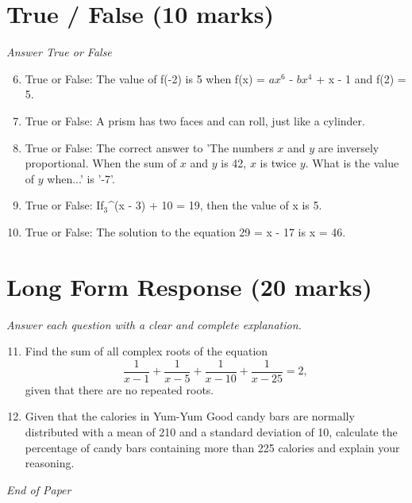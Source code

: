 \documentclass[12pt]{article}
\begin{document}
\section*{True / False (10 marks)}
\textit{Answer True or False}
\begin{enumerate}[label=\arabic*.]
\setcounter{enumi}{5}
\item True or False: The value of f(-2) is 5 when f(x) = $ax^6$ - $bx^4$ + x - 1 and f(2) = 5.
\item True or False: A prism has two faces and can roll, just like a cylinder.
\item True or False: The correct answer to 'The numbers $x$ and $y$ are inversely proportional. When the sum of $x$ and $y$ is 42, $x$ is twice $y$. What is the value of $y$ when...' is '-7'.
\item True or False: If$_{3}$^(x - 3) + 10 = 19, then the value of x is 5.
\item True or False: The solution to the equation 29 = x - 17 is x = 46.
\end{enumerate}

\section*{Long Form Response (20 marks)}
\textit{Answer each question with a clear and complete explanation.}
\begin{enumerate}[label=\arabic*.]
\setcounter{enumi}{10}
\item Find the sum of all complex roots of the equation \[\frac{1}{x-1} + \frac{1}{x-5} + \frac{1}{x-10} + \frac{1}{x-25} = 2,\]given that there are no repeated roots.
\item Given that the calories in Yum-Yum Good candy bars are normally distributed with a mean of 210 and a standard deviation of 10, calculate the percentage of candy bars containing more than 225 calories and explain your reasoning.
\end{enumerate}

\vfill
\noindent\textit{End of Paper}
\end{document}
